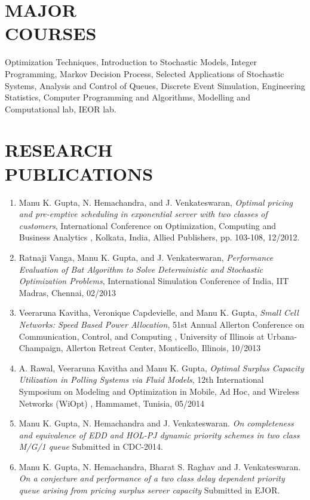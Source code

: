 \documentclass[line,margin]{res}
\begin{document}
\begin{resume}
                
\section{MAJOR \\ COURSES} Optimization Techniques, Introduction to Stochastic Models, Integer Programming,
Markov Decision Process, Selected Applications of Stochastic Systems, Analysis and Control of Queues,
Discrete Event Simulation, Engineering Statistics, Computer Programming
and Algorithms, Modelling and Computational lab, IEOR lab.

\section{RESEARCH\\
PUBLICATIONS} {\footnotesize \begin{enumerate}
\item Manu K. Gupta, N. Hemachandra, and J. Venkateswaran, \textit{Optimal pricing
and pre-emptive scheduling in exponential server with two classes of
customers}, International Conference on Optimization, Computing and
Business Analytics , Kolkata, India, Allied Publishers, pp. 103-108, 12/2012.
\item Ratnaji Vanga, Manu K. Gupta, and J. Venkateswaran, \textit{Performance Evaluation of Bat Algorithm to Solve Deterministic and Stochastic Optimization Problems}, International Simulation Conference of India, IIT Madras, Chennai, 02/2013

\item Veeraruna Kavitha, Veronique Capdevielle, and Manu K. Gupta, \textit{Small Cell Networks: Speed Based Power Allocation}, 51st Annual Allerton Conference on Communication, Control, and Computing , University of Illinois at Urbana-Champaign, Allerton Retreat Center, Monticello, Illinois, 10/2013

\item A. Rawal, Veeraruna Kavitha and Manu K. Gupta, \textit{Optimal Surplus Capacity Utilization in Polling Systems via Fluid Models}, 12th International Symposium on Modeling and Optimization in Mobile, Ad Hoc, and Wireless Networks (WiOpt) , Hammamet, Tunisia, 05/2014

\item Manu K. Gupta, N. Hemachandra and J. Venkateswaran. \textit{On completeness and equivalence of EDD and HOL-PJ dynamic priority schemes in two class M/G/1 queue} Submitted in CDC-2014.

\item Manu K. Gupta, N. Hemachandra, Bharat S. Raghav and J. Venkateswaran. \textit{On a conjecture and performance of a two class delay dependent priority queue arising from pricing surplus server capacity} Submitted in EJOR.


\end{enumerate}}
\end{resume}
\end{document}

